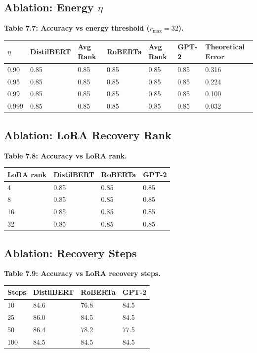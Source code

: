 \subsection{Ablation: Energy $\eta$}

\textbf{Table 7.7: Accuracy vs energy threshold ($r_\text{max} = 32$).}

\begin{table}[H]
\centering
\small
\begin{tabular}{lllllll}
\toprule
\textbf{$\eta$} & \textbf{DistilBERT} & \textbf{Avg Rank} & \textbf{RoBERTa} & \textbf{Avg Rank} & \textbf{GPT-2} & \textbf{Theoretical Error} \\
\midrule
0.90 & 0.85 & 0.85 & 0.85 & 0.85 & 0.85 & 0.316 \\
0.95 & 0.85 & 0.85 & 0.85 & 0.85 & 0.85 & 0.224 \\
0.99 & 0.85 & 0.85 & 0.85 & 0.85 & 0.85 & 0.100 \\
0.999 & 0.85 & 0.85 & 0.85 & 0.85 & 0.85 & 0.032 \\
\bottomrule
\end{tabular}
\end{table}

\subsection{Ablation: LoRA Recovery Rank}

\textbf{Table 7.8: Accuracy vs LoRA rank.}

\begin{table}[H]
\centering
\small
\begin{tabular}{llll}
\toprule
\textbf{LoRA rank} & \textbf{DistilBERT} & \textbf{RoBERTa} & \textbf{GPT-2} \\
\midrule
4 & 0.85 & 0.85 & 0.85 \\
8 & 0.85 & 0.85 & 0.85 \\
16 & 0.85 & 0.85 & 0.85 \\
32 & 0.85 & 0.85 & 0.85 \\
\bottomrule
\end{tabular}
\end{table}

\subsection{Ablation: Recovery Steps}

\textbf{Table 7.9: Accuracy vs LoRA recovery steps.}

\begin{table}[H]
\centering
\small
\begin{tabular}{llll}
\toprule
\textbf{Steps} & \textbf{DistilBERT} & \textbf{RoBERTa} & \textbf{GPT-2} \\
\midrule
10 & 84.6 & 76.8 & 84.5 \\
25 & 86.0 & 84.5 & 84.5 \\
50 & 86.4 & 78.2 & 77.5 \\
100 & 84.5 & 84.5 & 84.5 \\
\bottomrule
\end{tabular}
\end{table}

